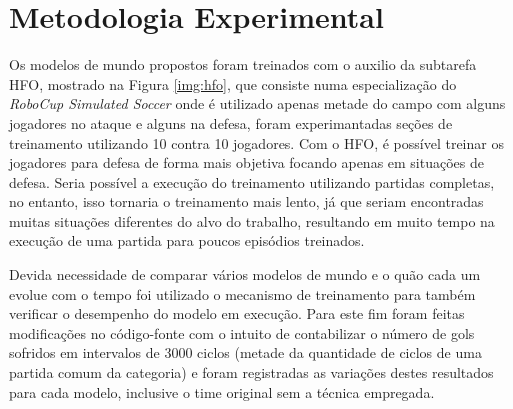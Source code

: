\section{Metodologia Experimental}\label{meotodologia}

Os modelos de mundo propostos foram treinados com o auxilio da subtarefa HFO,
mostrado na Figura \ref{img:hfo}, que consiste numa especialização do
\textit{RoboCup Simulated Soccer} onde é utilizado apenas metade do campo com
alguns jogadores no ataque e alguns na defesa, foram experimantadas seções de
treinamento utilizando 10 contra 10 jogadores. Com o HFO, é
possível treinar os jogadores para defesa de forma mais objetiva focando apenas
em situações de defesa. Seria possível a execução do treinamento utilizando
partidas completas, no entanto, isso tornaria o treinamento mais lento, já que
seriam encontradas muitas situações diferentes do alvo do trabalho,
resultando em muito tempo na execução de uma partida para poucos episódios
treinados.


Devida necessidade de comparar vários modelos de mundo e o quão cada um evolue com o
tempo foi utilizado o mecanismo de treinamento para também verificar o
desempenho do modelo em execução. Para este fim foram feitas modificações no
código-fonte com o intuito de contabilizar o número de gols sofridos em
intervalos de 3000 ciclos (metade da quantidade de ciclos de uma partida comum
da categoria) e foram registradas as variações destes resultados para cada
modelo, inclusive o time original sem a técnica empregada.